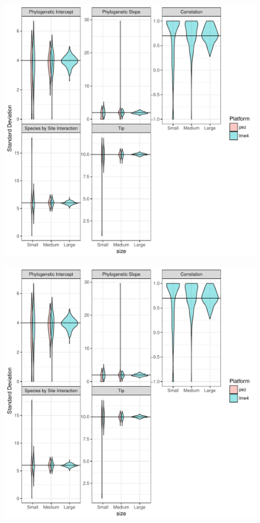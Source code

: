 \begin{center}
\begin{figure}[h]
\includegraphics[scale=0.8,page=1]{./csplot.pdf}
\end{figure}
\end{center}

\begin{center}
\begin{figure}[h]
\includegraphics[scale=0.8,page=2]{./csplot.pdf}
\end{figure}
\end{center}

